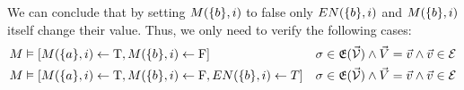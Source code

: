 \begin{frame}
    We can conclude that by setting $M(\{b\},i)$ to false only
    $EN(\{b\},i)$ and $M(\{b\},i)$ itself change their value.
    Thus, we only need to verify the following cases:
    \begin{align*}
        M & \vDash[M(\{a\},i)\leftarrow \mathrm{T},M(\{b\},i)\leftarrow \mathrm{F}] & \sigma \in \mathcal{\mathfrak{E}(\vec V)}
        \wedge \vec V = \vec v \wedge \vec v \in \mathcal{E} \\
        M & \vDash[M(\{a\},i)\leftarrow \mathrm{T},M(\{b\},i)\leftarrow \mathrm{F},EN(\{b\},i)\leftarrow T] &\sigma \in \mathcal{\mathfrak{E}(\vec V)}
        \wedge \vec V = \vec v \wedge \vec v \in \mathcal{E}
    \end{align*}
\end{frame}